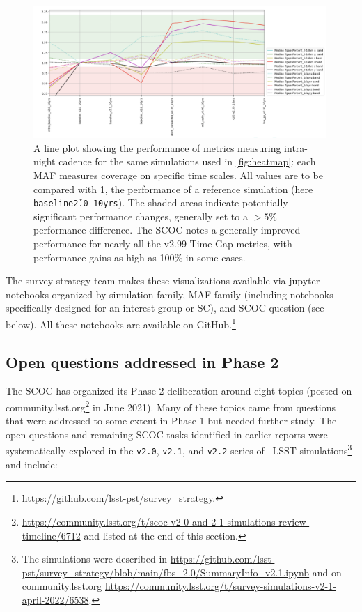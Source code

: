 \begin{figure}[h!]
\centering
\includegraphics[width=0.99\textwidth]{figures/SCOC299lines.png}
\caption{A line plot showing the performance of metrics measuring intra-night cadence for the same simulations used in \autoref{fig:heatmap}: each MAF measures coverage on specific time scales. All values are to be compared with 1, the performance of a reference simulation (here \texttt{baseline\v2.0\_10yrs}). The shaded areas indicate potentially significant performance changes, generally set to a $>5\%$ performance difference. The SCOC notes a generally improved performance for nearly all the v2.99 Time Gap metrics, with performance gains as high as 100\% in some cases.}
\label{fig:lineplot}
\end{figure}

\FloatBarrier
The survey strategy team makes these visualizations available via jupyter notebooks organized by simulation family, MAF family (including notebooks specifically designed for an interest group or SC), and SCOC question (see below). All these notebooks are available on GitHub.\footnote{\url{https://github.com/lsst-pst/survey_strategy}.}



\subsection{Open questions addressed in Phase 2}\label{sec:synopsis}

The SCOC has organized its Phase 2 deliberation around eight topics (posted on community.lsst.org\footnote{\url{https://community.lsst.org/t/scoc-v2-0-and-2-1-simulations-review-timeline/6712} and listed at the end of this section.} in June 2021). Many of these topics came from questions that were addressed to some extent in Phase 1 but needed further study. The open questions and remaining SCOC tasks identified in earlier reports  were systematically explored in the \texttt{v2.0}, \texttt{v2.1}, and \texttt{v2.2} series of \opsim\ LSST simulations\footnote{The simulations were described in \url{https://github.com/lsst-pst/survey_strategy/blob/main/fbs_2.0/SummaryInfo_v2.1.ipynb} and on community.lsst.org \url{https://community.lsst.org/t/survey-simulations-v2-1-april-2022/6538}.} and include:

